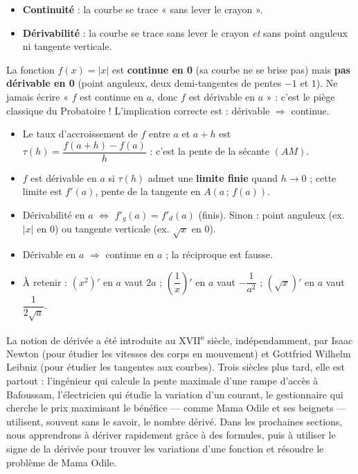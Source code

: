 \documentclass[11pt]{article}
\begin{document}
\begin{attention}
\begin{itemize}
\item \textbf{Continuité} : la courbe se trace « sans lever le crayon ».
\item \textbf{Dérivabilité} : la courbe se trace sans lever le crayon \emph{et} sans point anguleux ni tangente verticale.
\end{itemize}
La fonction $f(x) = |x|$ est \textbf{continue en 0} (sa courbe ne se brise pas) mais \textbf{pas dérivable en 0} (point anguleux, deux demi-tangentes de pentes $-1$ et $1$). Ne jamais écrire « $f$ est continue en $a$, donc $f$ est dérivable en $a$ » : c'est le piège classique du Probatoire ! L'implication correcte est : dérivable $\Rightarrow$ continue.
\end{attention}

\begin{aretenir}
\begin{itemize}
\item Le taux d'accroissement de $f$ entre $a$ et $a+h$ est $\tau(h) = \dfrac{f(a+h)-f(a)}{h}$ : c'est la pente de la sécante $(AM)$.
\item $f$ est dérivable en $a$ si $\tau(h)$ admet une \textbf{limite finie} quand $h \to 0$ ; cette limite est $f'(a)$, pente de la tangente en $A(a\,;\,f(a))$.
\item Dérivabilité en $a$ $\iff$ $f'_g(a) = f'_d(a)$ (finis). Sinon : point anguleux (ex. $|x|$ en $0$) ou tangente verticale (ex. $\sqrt{x}$ en $0$).
\item Dérivable en $a$ $\Rightarrow$ continue en $a$ ; la réciproque est fausse.
\item À retenir : $(x^2)'$ en $a$ vaut $2a$ ; $\left(\dfrac{1}{x}\right)'$ en $a$ vaut $-\dfrac{1}{a^2}$ ; $(\sqrt{x})'$ en $a$ vaut $\dfrac{1}{2\sqrt{a}}$.
\end{itemize}
\end{aretenir}

\begin{savaistu}
La notion de dérivée a été introduite au XVII\textsuperscript{e} siècle, indépendamment, par Isaac Newton (pour étudier les vitesses des corps en mouvement) et Gottfried Wilhelm Leibniz (pour étudier les tangentes aux courbes). Trois siècles plus tard, elle est partout : l'ingénieur qui calcule la pente maximale d'une rampe d'accès à Bafoussam, l'électricien qui étudie la variation d'un courant, le gestionnaire qui cherche le prix maximisant le bénéfice — comme Mama Odile et ses beignets — utilisent, souvent sans le savoir, le nombre dérivé. Dans les prochaines sections, nous apprendrons à dériver rapidement grâce à des formules, puis à utiliser le signe de la dérivée pour trouver les variations d'une fonction et résoudre le problème de Mama Odile.
\end{savaistu}
\end{document}
